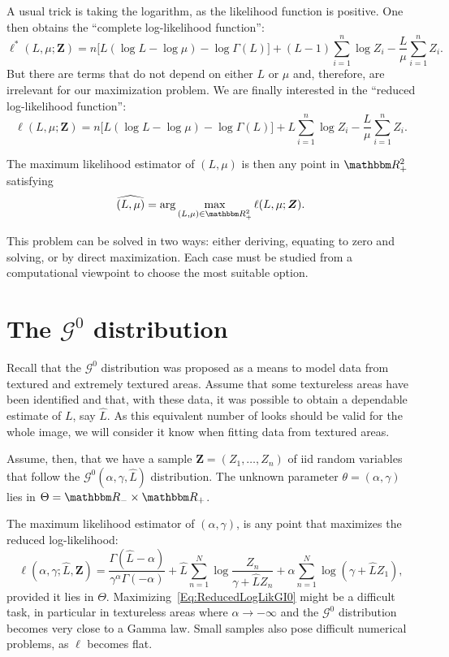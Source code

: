 A usual trick is taking the logarithm, as the likelihood function is positive.
One then obtains the ``complete log-likelihood function'':
\begin{equation}
\ell^*(L,\mu;\bm Z)=n\big[L(\log L - \log\mu) - \log\Gamma(L)
\big] + (L-1)\sum_{i=1}^n \log Z_i - \frac{L}{\mu} \sum_{i=1}^n Z_i.
\end{equation}
But there are terms that do not depend on either $L$ or $\mu$ and, therefore, are irrelevant for our maximization problem.
We are finally interested in the ``reduced log-likelihood function'':
\begin{equation}
\ell(L,\mu;\bm Z)=n\big[L(\log L - \log\mu) - \log\Gamma(L)
\big] + L\sum_{i=1}^n \log Z_i - \frac{L}{\mu} \sum_{i=1}^n Z_i.
\label{eq:RedLogLikGammaSAR}
\end{equation}

The maximum likelihood estimator of $(L,\mu)$ is then any point in $\mathbbm R_+^2$ satisfying
\begin{equation}
\widehat{(L,\mu)} = \arg\max_{(L,\mu)\in\mathbbm R_+^2} \ell(L,\mu;\bm Z).
\end{equation}

This problem can be solved in two ways: either deriving, equating to zero and solving, or by direct maximization.
Each case must be studied from a computational viewpoint to choose the most suitable option.

\section{The $\mathcal G^0$ distribution}

Recall that the $\mathcal G^0$ distribution was proposed as a means to model data from textured and extremely textured areas.
Assume that some textureless areas have been identified and that, with these data, it was possible to obtain a dependable estimate of $L$, say $\widehat L$.
As this equivalent number of looks should be valid for the whole image, we will consider it know when fitting data from textured areas.

Assume, then, that we have a sample $\bm Z = (Z_1,\dots,Z_n)$ of iid random variables that follow the $\mathcal G^0(\alpha,\gamma,\widehat L)$ distribution.
The unknown parameter $\theta=(\alpha,\gamma)$ lies in $\Theta=\mathbbm R_- \times \mathbbm R_+$.

The maximum likelihood estimator of $(\alpha,\gamma)$, is any point that maximizes the reduced log-likelihood:
\begin{equation}
\ell(\alpha,\gamma;\widehat L, \bm Z) = 
\frac{\Gamma(\widehat L-\alpha)}{\gamma^\alpha \Gamma(-\alpha)} +
\widehat L \sum_{n=1}^N \log\frac{Z_n}{\gamma+\widehat L Z_n} + 
\alpha \sum_{n=1}^N \log(\gamma + \widehat L Z_1),
\label{Eq:ReducedLogLikGI0}
\end{equation}
provided it lies in $\Theta$.
Maximizing~\eqref{Eq:ReducedLogLikGI0} might be a difficult task, in particular in textureless areas where $\alpha\to-\infty$ and the $\mathcal G^0$ distribution becomes very close to a Gamma law.
Small samples also pose difficult numerical problems, as $\ell$ becomes flat\cite{FreryCribariSouza:JASP:04}.

